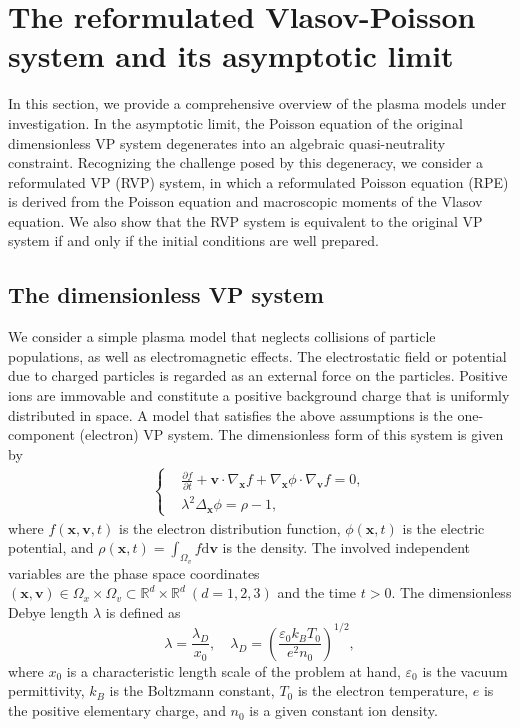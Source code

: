 \documentclass[letterpaper,10pt]{article}
\numberwithin{equation}{section}
\numberwithin{figure}{section}
\numberwithin{table}{section}
\begin{document}
\section{The reformulated Vlasov-Poisson system and its asymptotic limit}

\hspace{4pt}
In this section, we provide a comprehensive overview of the plasma models under investigation. In the asymptotic limit, the Poisson equation of the original dimensionless VP system
degenerates into an algebraic quasi-neutrality constraint. Recognizing the challenge posed by this degeneracy, we consider a reformulated VP (RVP) system, in which a reformulated Poisson equation (RPE) is derived from the Poisson equation and macroscopic moments of the Vlasov equation. We also show that the RVP system is equivalent to the original VP system if and only if the initial conditions are well prepared.

\subsection{The dimensionless VP system}
\hspace{4pt}
We consider a simple plasma model that neglects collisions of particle populations, as well as electromagnetic effects. The electrostatic field or potential due to charged particles is regarded as an external force on the particles. Positive ions are immovable and constitute a positive background charge that is uniformly distributed in space. A model that satisfies the above assumptions is the one-component (electron) VP system. The
 dimensionless form of this system is given by
\begin{align*}
  \left\{
    \begin{aligned}
      &\frac{\partial f}{\partial t}+\textbf{v}\cdot \nabla_{\textbf{x}} f+\nabla_{\textbf{x}}\phi\cdot\nabla_{\textbf{v}}f=0,\\
      &\lambda^2\Delta_{\textbf{x}} \phi = \rho-1,
    \end{aligned}
  \right.
\end{align*}
where $f(\textbf{x},\textbf{v},t)$ is the electron distribution function,
$\phi(\textbf{x},t)$ is the electric potential, and $\rho(\textbf{x},t)=\int_{\Omega_v}f\mathrm d\textbf{v}$ is the density. The involved independent variables are the phase space coordinates $(\textbf{x},\textbf{v})\in \Omega_x \times \Omega_v \subset {\mathbb{R}}^d \times {\mathbb{R}}^d~(d=1,2,3)$ and the time $t>0$. 
The dimensionless Debye length $\lambda$ is defined as 
$$
  \lambda=\frac{\lambda_D}{x_0},\quad\lambda_D=\left(\frac{\varepsilon_0 k_B T_0}{e^2 n_0}\right)^{1/2},
$$
where $x_0$ is a characteristic length scale of the problem at hand, $\varepsilon_0$ is the vacuum permittivity, $k_B$ is the Boltzmann constant, $T_0$ is the electron temperature, $e$ is the positive elementary charge, and $n_0$ is a given constant ion density.
\end{document}
